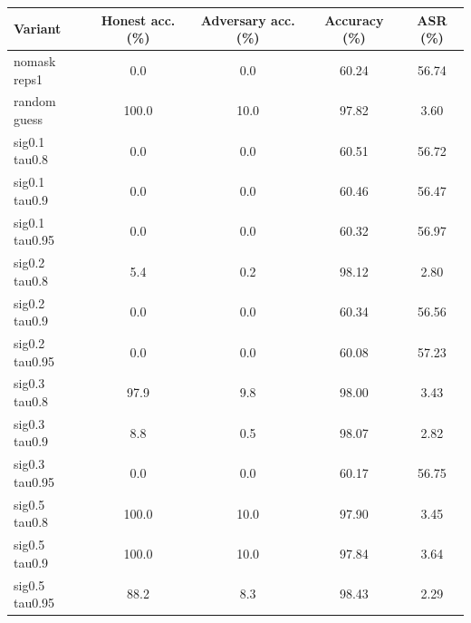 \begin{tabular}{lcccc}
\toprule
Variant & Honest acc. (\%) & Adversary acc. (\%) & Accuracy (\%) & ASR (\%) \\
\midrule
nomask reps1 & 0.0 & 0.0 & 60.24 & 56.74 \\
random guess & 100.0 & 10.0 & 97.82 & 3.60 \\
sig0.1 tau0.8 & 0.0 & 0.0 & 60.51 & 56.72 \\
sig0.1 tau0.9 & 0.0 & 0.0 & 60.46 & 56.47 \\
sig0.1 tau0.95 & 0.0 & 0.0 & 60.32 & 56.97 \\
sig0.2 tau0.8 & 5.4 & 0.2 & 98.12 & 2.80 \\
sig0.2 tau0.9 & 0.0 & 0.0 & 60.34 & 56.56 \\
sig0.2 tau0.95 & 0.0 & 0.0 & 60.08 & 57.23 \\
sig0.3 tau0.8 & 97.9 & 9.8 & 98.00 & 3.43 \\
sig0.3 tau0.9 & 8.8 & 0.5 & 98.07 & 2.82 \\
sig0.3 tau0.95 & 0.0 & 0.0 & 60.17 & 56.75 \\
sig0.5 tau0.8 & 100.0 & 10.0 & 97.90 & 3.45 \\
sig0.5 tau0.9 & 100.0 & 10.0 & 97.84 & 3.64 \\
sig0.5 tau0.95 & 88.2 & 8.3 & 98.43 & 2.29 \\
\bottomrule
\end{tabular}
